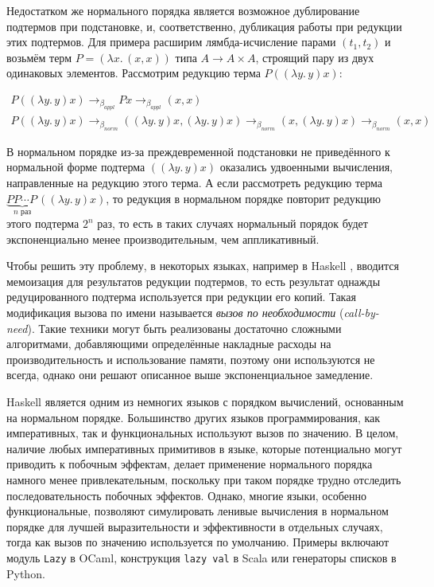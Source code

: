 \documentclass[../thesis.tex]{subfiles}
\begin{document}
Недостатком же нормального порядка является возможное дублирование подтермов при подстановке, и, соответственно, дубликация работы при редукции этих подтермов. Для примера расширим лямбда-исчисление парами $(t_1, t_2)$ и возьмём терм $P = (\lambda x.\, (x, x))$  типа $A \rightarrow A \times A$, строящий пару из двух одинаковых элементов. Рассмотрим редукцию терма $P ((\lambda y.\, y) x)$:

\begin{equation}
\begin{gathered}
P ((\lambda y.\, y) x) \rightarrow_{\beta_{appl}} P x \rightarrow_{\beta_{appl}} (x, x) \\P ((\lambda y.\, y) x) \rightarrow_{\beta_{norm}} ((\lambda y.\, y) x, (\lambda y.\, y) x) \rightarrow_{\beta_{norm}} (x, (\lambda y.\, y) x) \rightarrow_{\beta_{norm}} (x, x)
\end{gathered}
\end{equation}

В нормальном порядке из-за преждевременной подстановки не приведённого к нормальной форме подтерма $((\lambda y.\, y) x)$ оказались удвоенными вычисления, направленные на редукцию этого терма. А если рассмотреть редукцию терма $\underbrace{P P \cdots P\,}_\text{$n$ раз}((\lambda y.\, y) x)$, то редукция в нормальном порядке повторит редукцию этого подтерма $2^n$ раз, то есть в таких случаях нормальный порядок будет экспоненциально менее производительным, чем аппликативный.

Чтобы решить эту проблему, в некоторых языках, например в Haskell \cite{slpj}, вводится мемоизация для результатов редукции подтермов, то есть результат однажды редуцированного подтерма используется при редукции его копий. Такая модификация вызова по имени называется \textit{вызов по необходимости} (\textit{call-by-need}). Такие техники могут быть реализованы достаточно сложными алгоритмами, добавляющими определённые накладные расходы на производительность и использование памяти, поэтому они используются не всегда, однако они решают описанное выше экспоненциальное замедление.

Haskell является одним из немногих языков с порядком вычислений, основанным на нормальном порядке. Большинство других языков программирования, как императивных, так и функциональных используют вызов по значению. В целом, наличие любых императивных примитивов в языке, которые потенциально могут приводить к побочным эффектам, делает применение нормального порядка намного менее привлекательным, поскольку при таком порядке трудно отследить последовательность побочных эффектов. Однако, многие языки, особенно функциональные, позволяют симулировать ленивые вычисления в нормальном порядке для лучшей выразительности и эффективности в отдельных случаях, тогда как вызов по значению используется по умолчанию. Примеры включают модуль \texttt{Lazy} в OCaml, конструкция \texttt{lazy val} в Scala или генераторы списков в Python.
\end{document}
